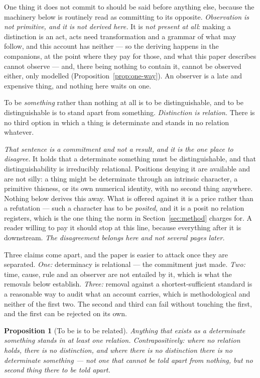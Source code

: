 \documentclass[11pt,a4paper]{article}
\newtheorem{proposition}{Proposition}
\theoremstyle{remark}\newtheorem{remark}[proposition]{Remark}
\begin{document}
One thing it does not commit to should be said before anything else, because the machinery below is
routinely read as committing to its opposite. \emph{Observation is not primitive, and it is not derived here.} It is
\emph{not present at all}: making a distinction is an act, acts need transformation and a grammar of
what may follow, and this account has neither --- so the deriving happens in the companions, at the
point where they pay for those, and what this paper describes cannot observe --- and, there being nothing to contain it, cannot be
observed either, only modelled (Proposition~\ref{prop:one-way}). An observer is a late and expensive
thing, and nothing here waits on one.

To be \emph{something} rather than nothing at all is to be distinguishable, and to be distinguishable is
to stand apart from something. \emph{Distinction is relation.} There is no third option in which a thing
is determinate and stands in no relation whatever.

\emph{That sentence is a commitment and not a result, and it is the one place to disagree.} It holds
that a determinate something must be distinguishable, and that distinguishability is irreducibly
relational. Positions denying it are available and are not silly: a thing might be determinate through
an intrinsic character, a primitive thisness, or its own numerical identity, with no second thing
anywhere. Nothing below derives this away. What is offered against it is a price rather than a
refutation --- such a character has to be \emph{posited}, and it is a posit no relation registers,
which is the one thing the norm in Section~\ref{sec:method} charges for. A reader willing to pay it
should stop at this line, because everything after it is downstream. \emph{The disagreement belongs
here and not several pages later.}

Three claims come apart, and the paper is easier to attack once they are separated. \emph{One:}
determinacy is relational --- the commitment just made. \emph{Two:} time, cause, rule and an observer
are not entailed by it, which is what the removals below establish. \emph{Three:} removal against a
shortest-sufficient standard is a reasonable way to audit what an account carries, which is
methodological and neither of the first two. The second and third can fail without touching the
first, and the first can be rejected on its own.

\begin{proposition}[To be is to be related]\label{prop:is}
Anything that exists as a determinate something stands in at least one relation. Contrapositively:
where no relation holds, there is no distinction, and where there is no distinction there is no
determinate something --- not one that cannot be told apart from nothing, but no second thing there to
be told apart.
\end{proposition}
\end{document}
